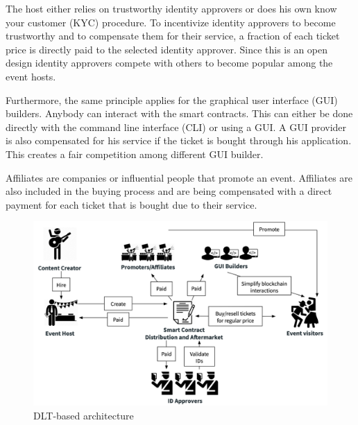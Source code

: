 The host either relies on trustworthy identity approvers or does his own know your customer (KYC) procedure. To incentivize identity approvers to become trustworthy and to compensate them for their service, a fraction of each ticket price is directly paid to the selected identity approver. Since this is an open design identity approvers compete with others to become popular among the event hosts.

Furthermore, the same principle applies for the graphical user interface (GUI) builders. Anybody can interact with the smart contracts. This can either be done directly with the command line interface (CLI) or using a GUI. A GUI provider is also compensated for his service if the ticket is bought through his application. This creates a fair competition among different GUI builder.

Affiliates are companies or influential people that promote an event. Affiliates are also included in the buying process and are being compensated with a direct payment for each ticket that is bought due to their service. 


\begin{figure}[H]
    \centering
    \includegraphics[width=16cm]{figures/dlt-based-landscape.png}
    \caption{DLT-based architecture}
    \label{fig:dlt-based-landscape}
\end{figure}